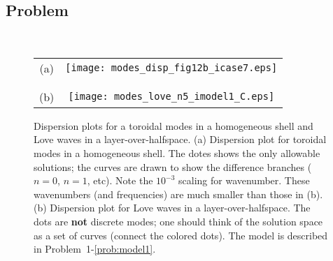 \documentclass[11pt,titlepage,fleqn]{article}
\begin{document}

\subsection*{Problem} \howmuchtime\

\pagebreak






\clearpage\pagebreak
\begin{figure}
\centering
\begin{tabular}{cc}
(a) & \texttt{[image: modes\_disp\_fig12b\_icase7.eps]} \\
& \\ & \\
(b) & \texttt{[image: modes\_love\_n5\_imodel1\_C.eps]} 
\end{tabular}
\caption[]
{{
Dispersion plots for a toroidal modes in a homogeneous shell and Love waves in a layer-over-halfspace.
(a) Dispersion plot for toroidal modes in a homogeneous shell. The dotes shows the only allowable solutions; the curves are drawn to show the difference branches ($n=0$, $n=1$, etc). 
Note the $10^{-3}$ scaling for wavenumber. These wavenumbers (and frequencies) are much smaller than those in (b).
(b) Dispersion plot for Love waves in a layer-over-halfspace. The dots are {\bf not} discrete modes; one should think of the solution space as a set of curves (\ie connect the colored dots).
The model is described in Problem~1-\ref{prob:model1}.
\label{fig:dots}
}}
\end{figure}

\clearpage\pagebreak
\end{document}
